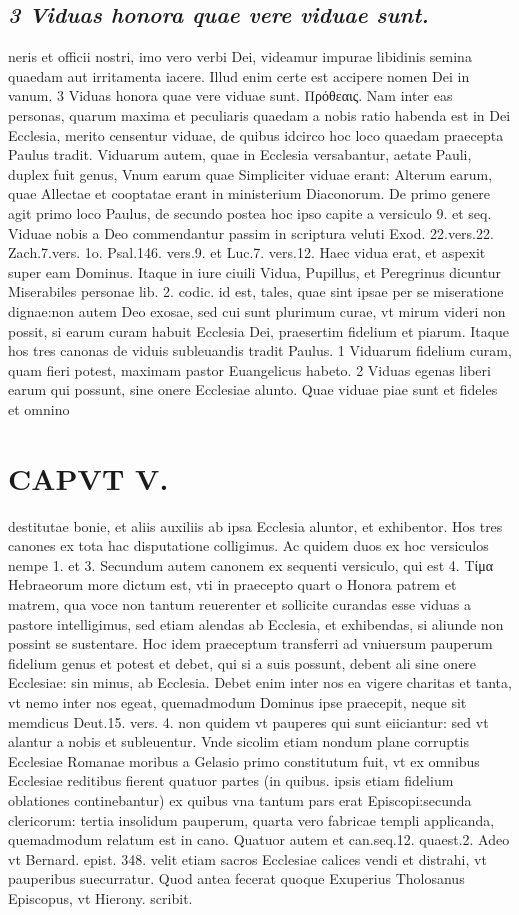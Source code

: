 \documentclass{article}
\begin{document}
\begin{pages}
\subsection*{\textit{3 Viduas honora quae vere viduae sunt.}}neris et officii nostri, imo vero verbi Dei, videamur impurae libidinis semina quaedam aut irritamenta iacere. Illud enim certe est accipere nomen Dei in vanum. 3 Viduas honora quae vere viduae sunt. Πρόθεαις. Nam inter eas personas, quarum maxima et peculiaris quaedam a nobis ratio habenda est in Dei Ecclesia, merito censentur viduae, de quibus idcirco hoc loco quaedam praecepta Paulus tradit. Viduarum autem, quae in Ecclesia versabantur, aetate Pauli, duplex fuit genus, Vnum earum quae Simpliciter viduae erant: Alterum earum, quae Allectae et cooptatae erant in ministerium Diaconorum. De primo genere agit primo loco Paulus, de secundo postea hoc ipso capite a versiculo 9. et seq. Viduae nobis a Deo commendantur passim in scriptura veluti Exod. 22.vers.22. Zach.7.vers. 1o. Psal.146. vers.9. et Luc.7. vers.12. Haec vidua erat, et aspexit super eam Dominus. Itaque in iure ciuili Vidua, Pupillus, et Peregrinus dicuntur Miserabiles personae lib.  2. codic. id est, tales, quae sint ipsae per se miseratione dignae:non autem Deo exosae, sed cui sunt plurimum curae, vt mirum videri non possit, si earum curam habuit Ecclesia Dei, praesertim fidelium et piarum. Itaque hos tres canonas de viduis subleuandis tradit Paulus. 1 Viduarum fidelium curam, quam fieri potest, maximam pastor Euangelicus habeto. 2 Viduas egenas liberi earum qui possunt, sine onere Ecclesiae alunto. Quae viduae piae sunt et fideles et omnino  \pend
\section*{CAPVT  V. }
\marginpar{[ p.83 ]}\pstart destitutae bonie, et aliis auxiliis ab ipsa Ecclesia aluntor, et exhibentor. Hos tres canones ex tota hac disputatione colligimus. Ac quidem duos ex hoc versiculos nempe 1. et 3. Secundum autem canonem ex sequenti versiculo, qui est 4. Tίμα Hebraeorum more dictum est, vti in praecepto quart o Honora patrem et matrem, qua voce non tantum reuerenter et sollicite curandas esse viduas a pastore intelligimus, sed etiam alendas ab Ecclesia, et exhibendas, si aliunde non possint se sustentare. Hoc idem praeceptum transferri ad vniuersum pauperum fidelium genus et potest et debet, qui si a suis possunt, debent ali sine onere Ecclesiae: sin minus, ab Ecclesia. Debet enim inter nos ea vigere charitas et tanta, vt nemo inter nos egeat, quemadmodum Dominus ipse praecepit, neque sit memdicus Deut.15. vers. 4. non quidem vt pauperes qui sunt eiiciantur: sed vt alantur a nobis et subleuentur. Vnde sicolim etiam nondum plane corruptis Ecclesiae Romanae moribus a Gelasio primo constitutum fuit, vt ex omnibus Ecclesiae reditibus fierent quatuor partes (in quibus. ipsis etiam fidelium oblationes continebantur) ex quibus vna tantum pars erat Episcopi:secunda clericorum: tertia insolidum pauperum, quarta vero fabricae templi applicanda, quemadmodum relatum est in cano. Quatuor autem et can.seq.12. quaest.2. Adeo vt Bernard. epist. 348. velit etiam sacros Ecclesiae calices vendi et distrahi, vt pauperibus suecurratur. Quod antea fecerat quoque Exuperius Tholosanus Episcopus, vt Hierony. scribit.  \pend

\end{pages}
\end{document}
